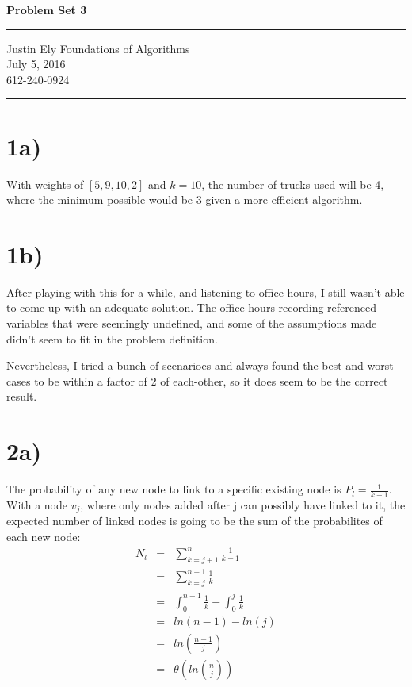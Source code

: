 \documentclass[a4paper,11pt]{article}
\begin{document}
\begin{flushright}

\vspace{1.1cm}

{\bf\Huge Problem Set 3}

\rule{0.25\linewidth}{0.5pt}

\vspace{0.5cm}
Justin Ely
\linebreak
\newline
\footnotesize{Foundations of Algorithms \\}
July 5, 2016 \\
612-240-0924
\end{flushright}

\noindent\rule{\linewidth}{1.0pt}

\section*{1a)}
With weights of $[5, 9, 10, 2]$ and $k=10$, the number of 
trucks used will be 4, where the minimum possible would be 3
given a more efficient algorithm.

\section*{1b)}
After playing with this for a while, and listening to office hours,
I still wasn't able to come up with an adequate solution.  The office
hours recording referenced variables that were seemingly undefined, and 
some of the assumptions made didn't seem to fit in the problem definition.

Nevertheless, I tried a bunch of scenarioes and always found the best and
worst cases to be within a factor of 2 of each-other, so it does seem to be
the correct result.


\section*{2a)}
The probability of any new node to link to a specific existing node
is $P_l = \frac{1}{k-1}$.  With a node $v_j$, where only nodes added
after j can possibly have linked to it, the expected number of linked
nodes is going to be the sum of the probabilites of each new node:
\begin{eqnarray}
N_l &=& \sum_{k=j+1}^{n} \frac{1}{k-1}\\
&=& \sum_{k=j}^{n-1} \frac{1}{k} \\
&=& \int_{0}^{n-1} \frac{1}{k} - \int_{0}^{j} \frac{1}{k} \\
&=& ln(n-1) - ln(j)\\
&=& ln(\frac{n-1}{j}) \\
&=& \theta(ln(\frac{n}{j}))
\end{eqnarray}
\end{document}
